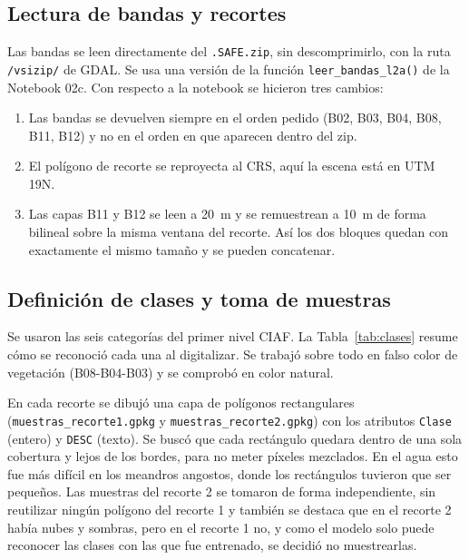 \documentclass[11pt,letterpaper]{article}
\begin{document}
\subsection{Lectura de bandas y recortes}
Las bandas se leen directamente del \texttt{.SAFE.zip}, sin descomprimirlo, con la ruta
\texttt{/vsizip/} de GDAL. Se usa una versión de la función \texttt{leer\_bandas\_l2a()} de la Notebook 02c.
Con respecto a la notebook se hicieron tres cambios:
\begin{enumerate}
    \item Las bandas se devuelven siempre en el orden pedido (B02, B03, B04, B08, B11, B12) y no en el orden
    en que aparecen dentro del zip.
    \item El polígono de recorte se reproyecta al CRS, aquí la escena está en UTM 19N.
    \item Las capas B11 y B12 se leen a 20~m y se remuestrean a 10~m de forma bilineal sobre la misma ventana del
    recorte. Así los dos bloques quedan con exactamente el mismo tamaño y se pueden concatenar.
\end{enumerate}

\subsection{Definición de clases y toma de muestras}
Se usaron las seis categorías del primer nivel CIAF. La Tabla~\ref{tab:clases} resume cómo se reconoció
cada una al digitalizar. Se trabajó sobre todo en falso color de vegetación (B08-B04-B03) y se comprobó en
color natural.

En cada recorte se dibujó una capa de polígonos rectangulares (\texttt{muestras\_recorte1.gpkg} y
\texttt{muestras\_recorte2.gpkg}) con los atributos \texttt{Clase} (entero) y \texttt{DESC} (texto). Se
buscó que cada rectángulo quedara dentro de una sola cobertura y lejos de los bordes, para no meter píxeles
mezclados. En el agua esto fue más difícil en los meandros angostos, donde los rectángulos tuvieron que ser
pequeños. Las muestras del recorte 2 se tomaron de forma independiente, sin reutilizar ningún polígono del
recorte 1 y también se destaca que en el recorte 2 había nubes y sombras, pero en el recorte 1 no, y como el modelo solo puede reconocer las clases con las que fue entrenado, se decidió no muestrearlas.
\end{document}
